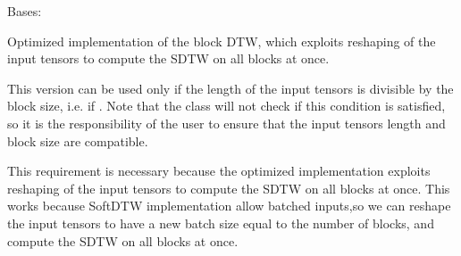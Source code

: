 \documentclass[letterpaper,10pt,english]{sphinxmanual}
\begin{document}
\begin{fulllineitems}
\label{\detokenize{dtw_loss_functions.block_dtw:dtw_loss_functions.block_dtw.block_dtw_optimized}}
\pysigstartsignatures
\pysiglinewithargsret
{}
{\sphinxparamcomma {}\sphinxparamcomma {}\sphinxparamcomma {}\sphinxparamcomma {}\sphinxparamcomma {}\sphinxparamcomma {}\sphinxparamcomma {}}
{}
\pysigstopsignatures
\sphinxAtStartPar
Bases: {\hyperref[\detokenize{dtw_loss_functions.soft_dtw:dtw_loss_functions.soft_dtw.soft_dtw}]{}}

\sphinxAtStartPar
Optimized implementation of the block DTW, which exploits reshaping of the input tensors to compute the SDTW on all blocks at once.

\sphinxAtStartPar
This version can be used only if the length of the input tensors is divisible by the block size, i.e. if .
Note that the class will not check if this condition is satisfied, so it is the responsibility of the user to ensure that the input tensors length and block size are compatible.

\sphinxAtStartPar
This requirement is necessary because the optimized implementation exploits reshaping of the input tensors to compute the SDTW on all blocks at once.
This works because SoftDTW implementation allow batched inputs,so we can reshape the input tensors to have a new batch size equal to the number of blocks, and compute the SDTW on all blocks at once.


\end{fulllineitems}
\end{document}
